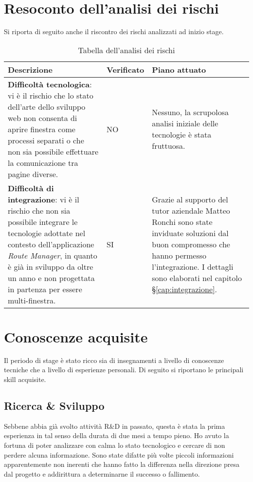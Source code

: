 \section{Resoconto dell'analisi dei rischi}

Si riporta di seguito anche il riscontro dei rischi analizzati ad inizio stage.

\begin{table}[H]
\small
\begin{tabular}{ |p{4.5cm} |p{1.75cm} |p{6.5cm}|}
\hline
\textbf{Descrizione} & \textbf{Verificato} & \textbf{Piano attuato} \\ \hline
\textbf{Difficoltà tecnologica}: vi è il rischio che lo stato dell'arte dello sviluppo web non consenta di aprire finestra come processi separati o che non sia possibile effettuare la comunicazione tra pagine diverse. & NO & Nessuno, la scrupolosa analisi iniziale delle tecnologie è stata fruttuosa. \\ \hline

\textbf{Difficoltà di integrazione}: vi è il rischio che non sia possibile integrare le tecnologie adottate nel contesto dell'applicazione \textit{Route Manager}, in quanto è già in sviluppo da oltre un anno e non progettata in partenza per essere multi-finestra. & SI & Grazie al supporto del tutor aziendale Matteo Ronchi sono state inviduate soluzioni dal buon compromesso che hanno permesso l'integrazione. I dettagli sono elaborati nel capitolo §\ref{cap:integrazione}. \\ \hline
\end{tabular}
\caption{Tabella dell'analisi dei rischi}
\end{table}

\section{Conoscenze acquisite}

Il periodo di stage è stato ricco sia di insegnamenti a livello di conoscenze tecniche che a livello di esperienze personali. Di seguito si riportano le principali skill acquisite.

\subsection{Ricerca \& Sviluppo}

Sebbene abbia già svolto attività R\&D in passato, questa è stata la prima esperienza in tal senso della durata di due mesi a tempo pieno. Ho avuto la fortuna di poter analizzare con calma lo stato tecnologico e cercare di non perdere alcuna informazione. Sono state difatte più volte piccoli informazioni apparentemente non inerenti che hanno fatto la differenza nella direzione presa dal progetto e addirittura a determinarne il successo o fallimento. \\

